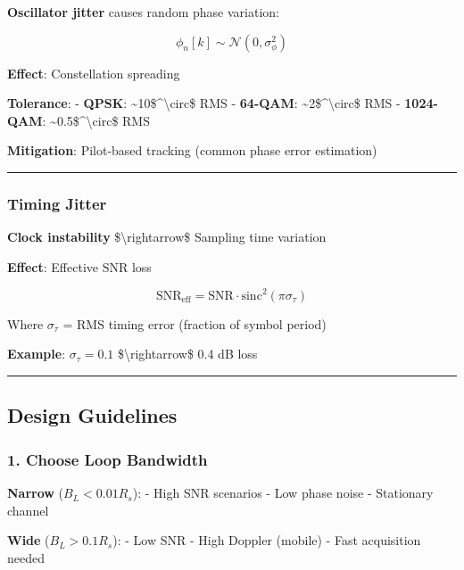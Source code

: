\textbf{Oscillator jitter} causes random phase variation:

\[
\phi_n[k] \sim \mathcal{N}(0, \sigma_\phi^2)
\]

\textbf{Effect}: Constellation spreading

\textbf{Tolerance}: - \textbf{QPSK}:
\textasciitilde10\$\^{}\textbackslash circ\$ RMS - \textbf{64-QAM}:
\textasciitilde2\$\^{}\textbackslash circ\$ RMS - \textbf{1024-QAM}:
\textasciitilde0.5\$\^{}\textbackslash circ\$ RMS

\textbf{Mitigation}: Pilot-based tracking (common phase error
estimation)

\begin{center}\rule{0.5\linewidth}{0.5pt}\end{center}

\subsubsection{Timing Jitter}\label{timing-jitter}

\textbf{Clock instability} \$\textbackslash rightarrow\$ Sampling time
variation

\textbf{Effect}: Effective SNR loss

\[
\text{SNR}_{\text{eff}} = \text{SNR} \cdot \text{sinc}^2(\pi \sigma_\tau)
\]

Where \(\sigma_\tau\) = RMS timing error (fraction of symbol period)

\textbf{Example}: \(\sigma_\tau = 0.1\) \$\textbackslash rightarrow\$
0.4 dB loss

\begin{center}\rule{0.5\linewidth}{0.5pt}\end{center}

\subsection{Design Guidelines}\label{design-guidelines}

\subsubsection{1. Choose Loop Bandwidth}\label{choose-loop-bandwidth}

\textbf{Narrow} (\(B_L < 0.01 R_s\)): - High SNR scenarios - Low phase
noise - Stationary channel

\textbf{Wide} (\(B_L > 0.1 R_s\)): - Low SNR - High Doppler (mobile) -
Fast acquisition needed

